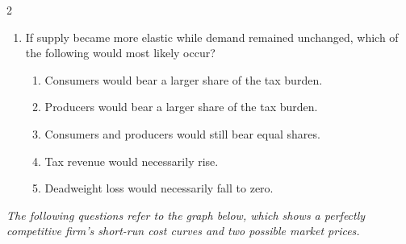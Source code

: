 \documentclass[10pt]{article}
\newenvironment{choiceslist}
  {\begin{enumerate}[label=(\Alph*), leftmargin=1.55em, itemsep=0.1em, topsep=0.15em, parsep=0pt]}
  {\end{enumerate}}
\newenvironment{stimulus}
  {\begin{center}\begin{minipage}{0.97\columnwidth}\footnotesize\itshape\setlength{\tabcolsep}{3pt}\renewcommand{\arraystretch}{0.96}}
  {\end{minipage}\end{center}}
\begin{document}
\begin{multicols*}{2}
\begin{enumerate}[resume*=curveq, leftmargin=*, itemsep=0.8em, topsep=0.18em, parsep=0pt]
\begin{choiceslist}
\item $(P_c-P_p)Q_t$
\item $\tfrac{1}{2}(P_c-P^{*})Q_t$
\item $(P^{*}-P_p)(Q^{*}-Q_t)$
\item $(P_c-P_p)Q^{*}$
\end{choiceslist}
\item If supply became more elastic while demand remained unchanged, which of the following would most likely occur?
\begin{choiceslist}
\item Consumers would bear a larger share of the tax burden.
\item Producers would bear a larger share of the tax burden.
\item Consumers and producers would still bear equal shares.
\item Tax revenue would necessarily rise.
\item Deadweight loss would necessarily fall to zero.
\end{choiceslist}
\end{enumerate}
\begin{stimulus}
The following questions refer to the graph below, which shows a perfectly competitive firm's short-run cost curves and two possible market prices.


\end{stimulus}
\end{multicols*}
\end{document}
